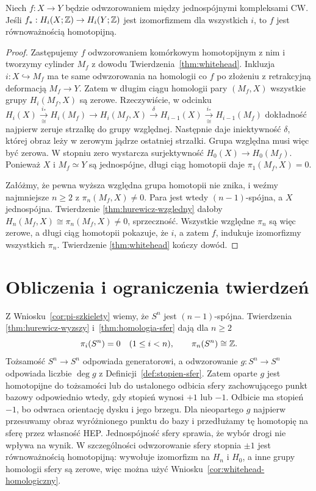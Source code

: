 \begin{wniosek}
\label{cor:whitehead-homologiczny}
Niech $f:X\to Y$ będzie odwzorowaniem
między jednospójnymi
kompleksami CW.
Jeśli
$f_*:H_i(X;\mathbb{Z})\to H_i(Y;\mathbb{Z})$
jest izomorfizmem
dla wszystkich $i$,
to $f$ jest
równoważnością
homotopijną.
\end{wniosek}
\begin{proof}
Zastępujemy $f$
odwzorowaniem komórkowym
homotopijnym z nim
i tworzymy cylinder
$M_f$ z dowodu
Twierdzenia~\ref{thm:whitehead}.
Inkluzja
$i:X\hookrightarrow M_f$
ma te same odwzorowania
na homologii co $f$
po złożeniu z
retrakcyjną deformacją
$M_f\to Y$.
Zatem w długim
ciągu homologii
pary $(M_f,X)$
wszystkie grupy
$H_i(M_f,X)$
są zerowe.
Rzeczywiście, w odcinku
$H_i(X)\xrightarrow[\cong]{i_*}H_i(M_f)\to H_i(M_f,X)
\xrightarrow{\delta}H_{i-1}(X)\xrightarrow[\cong]{i_*}H_{i-1}(M_f)$
dokładność najpierw zeruje strzałkę do grupy względnej.
Następnie daje iniektywność $\delta$, której obraz leży w zerowym
jądrze ostatniej strzałki. Grupa względna musi więc być zerowa.
W stopniu zero wystarcza surjektywność $H_0(X)\to H_0(M_f)$.
Ponieważ $X$
i $M_f\simeq Y$
są jednospójne,
długi ciąg homotopii
daje
$\pi_1(M_f,X)=0$.

Załóżmy, że pewna
wyższa względna
grupa homotopii
nie znika, i weźmy
najmniejsze $n\geq2$
z $\pi_n(M_f,X)\ne0$.
Para jest wtedy
$(n-1)$-spójna,
a $X$ jednospójna.
Twierdzenie
\ref{thm:hurewicz-wzgledny}
dałoby
$H_n(M_f,X)\cong
\pi_n(M_f,X)\ne0$,
sprzeczność.
Wszystkie względne
$\pi_n$ są więc
zerowe, a długi
ciąg homotopii
pokazuje, że
$i$, a zatem $f$,
indukuje izomorfizmy
wszystkich $\pi_n$.
Twierdzenie
\ref{thm:whitehead}
kończy dowód.
\end{proof}

\section{Obliczenia i ograniczenia twierdzeń}
\label{sec:pi-przyklady}

\begin{przyklad}
\label{prz:pi-sfera-hurewicz}
Z Wniosku~\ref{cor:pi-szkielety}
wiemy, że $S^n$
jest $(n-1)$-spójna.
Twierdzenia
\ref{thm:hurewicz-wyzszy}
i~\ref{thm:homologia-sfer}
dają dla $n\geq2$
\[
 \pi_i(S^n)=0\quad(1\leq i<n),
 \qquad
 \pi_n(S^n)\cong\mathbb{Z}.
\]
Tożsamość $S^n\to S^n$
odpowiada generatorowi,
a odwzorowanie $g:S^n\to S^n$
odpowiada liczbie
$\deg g$ z
Definicji~\ref{def:stopien-sfer}.
Zatem oparte $g$ jest homotopijne do tożsamości lub do ustalonego
odbicia sfery zachowującego punkt bazowy odpowiednio wtedy,
gdy stopień wynosi $+1$ lub $-1$.
Odbicie ma stopień $-1$, bo odwraca orientację dysku i jego brzegu.
Dla nieopartego $g$ najpierw przesuwamy obraz wyróżnionego punktu do bazy
i przedłużamy tę homotopię na sferę przez własność HEP.
Jednospójność sfery sprawia, że wybór drogi nie wpływa na wynik. W szczególności
odwzorowanie sfery stopnia
$\pm1$ jest
równoważnością
homotopijną:
wywołuje izomorfizm
na $H_n$ i $H_0$,
a inne grupy homologii
sfery są zerowe,
więc można użyć
Wniosku~\ref{cor:whitehead-homologiczny}.
\end{przyklad}

